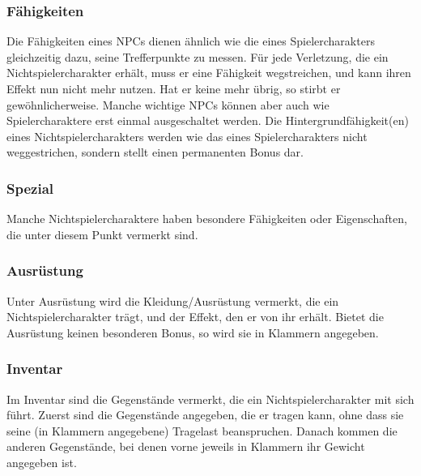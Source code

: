 \subsubsection{Fähigkeiten}
Die Fähigkeiten eines NPCs dienen ähnlich wie die eines Spielercharakters gleichzeitig dazu, seine Trefferpunkte zu messen. Für jede Verletzung, die ein Nichtspielercharakter erhält, muss er eine Fähigkeit wegstreichen, und kann ihren Effekt nun nicht mehr nutzen. Hat er keine mehr übrig, so stirbt er gewöhnlicherweise. Manche wichtige NPCs können aber auch wie Spielercharaktere erst einmal ausgeschaltet werden.
Die Hintergrundfähigkeit(en) eines Nichtspielercharakters werden wie das eines Spielercharakters nicht weggestrichen, sondern stellt einen permanenten Bonus dar.
\subsubsection{Spezial}
Manche Nichtspielercharaktere haben besondere Fähigkeiten oder Eigenschaften, die unter diesem Punkt vermerkt sind.
\subsubsection{Ausrüstung}
Unter Ausrüstung wird die Kleidung/Ausrüstung vermerkt, die ein Nichtspielercharakter trägt, und der Effekt, den er von ihr erhält. Bietet die Ausrüstung keinen besonderen Bonus, so wird sie in Klammern angegeben.
\subsubsection{Inventar}
Im Inventar sind die Gegenstände vermerkt, die ein Nichtspielercharakter mit sich führt. Zuerst sind die Gegenstände angegeben, die er tragen kann, ohne dass sie seine (in Klammern angegebene) Tragelast beanspruchen. Danach kommen die anderen Gegenstände, bei denen vorne jeweils in Klammern ihr Gewicht angegeben ist.
